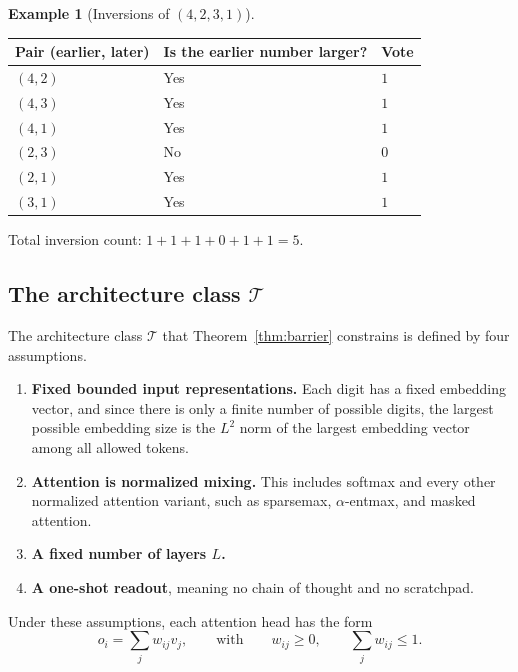 \documentclass[10pt]{article}
\theoremstyle{definition}
\newtheorem{example}{Example}
\begin{document}
\begin{example}[Inversions of $(4,2,3,1)$]
\label{ex:4231}
\begin{center}
\begin{tabular}{@{}lll@{}}
\toprule
\textbf{Pair (earlier, later)} & \textbf{Is the earlier number larger?} & \textbf{Vote} \\
\midrule
$(4,2)$ & Yes & $1$ \\
$(4,3)$ & Yes & $1$ \\
$(4,1)$ & Yes & $1$ \\
$(2,3)$ & No  & $0$ \\
$(2,1)$ & Yes & $1$ \\
$(3,1)$ & Yes & $1$ \\
\bottomrule
\end{tabular}
\end{center}
\noindent Total inversion count: $1+1+1+0+1+1 = 5$.
\end{example}

\subsection{The architecture class \texorpdfstring{$\mathcal{T}$}{T}}
\label{sec:classT}

The architecture class $\mathcal{T}$ that Theorem~\ref{thm:barrier}
constrains is defined by four assumptions.

\begin{enumerate}
\item \textbf{Fixed bounded input representations.} Each digit has a fixed
  embedding vector, and since there is only a finite number of possible
  digits, the largest possible embedding size is the $L^2$ norm of the
  largest embedding vector among all allowed tokens.
\item \textbf{Attention is normalized mixing.} This includes softmax and
  every other normalized attention variant, such as sparsemax,
  $\alpha$-entmax, and masked attention.
\item \textbf{A fixed number of layers $L$.}
\item \textbf{A one-shot readout}, meaning no chain of thought and no
  scratchpad.
\end{enumerate}

Under these assumptions, each attention head has the form
\begin{equation}
o_i = \sum_j w_{ij} v_j,
\qquad\text{with}\qquad
w_{ij} \geq 0, \qquad \sum_j w_{ij} \leq 1 .
\label{eq:convex}
\end{equation}
\end{document}
